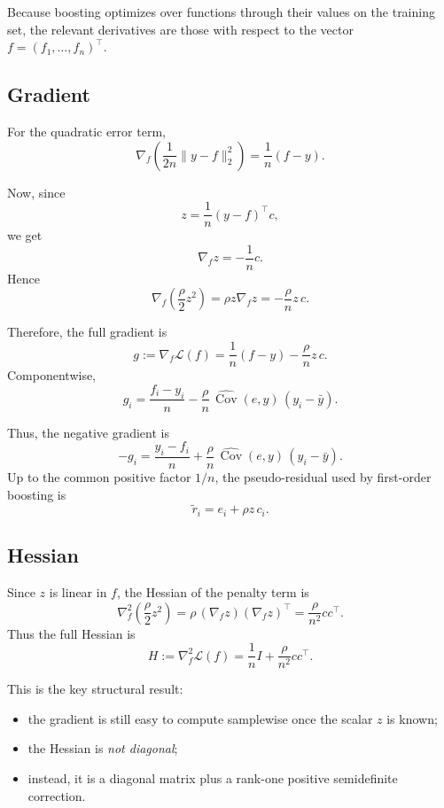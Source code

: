 \documentclass[11pt]{article}
\newcommand{\1}{\mathbf{1}}
\newcommand{\Cov}{\operatorname{Cov}}
\begin{document}
Because boosting optimizes over functions through their values on the training set, the relevant derivatives are those with respect to the vector $f=(f_1,\dots,f_n)^\top$.

\subsection{Gradient}

For the quadratic error term,
\[
\nabla_f \left(\frac{1}{2n}\|y-f\|_2^2\right)
=
\frac{1}{n}(f-y).
\]

Now, since
\[
z = \frac{1}{n}(y-f)^\top c,
\]
we get
\[
\nabla_f z = -\frac{1}{n}c.
\]
Hence
\[
\nabla_f \left(\frac{\rho}{2}z^2\right)
=
\rho z \nabla_f z
=
-\frac{\rho}{n}z\,c.
\]

Therefore, the full gradient is
\begin{equation}
\label{eq:gradient}
g := \nabla_f \mathcal{L}(f)
=
\frac{1}{n}(f-y)
-
\frac{\rho}{n} z\,c.
\end{equation}
Componentwise,
\begin{equation}
\label{eq:gradient-components}
g_i
=
\frac{f_i-y_i}{n}
-
\frac{\rho}{n}\,\widehat{\Cov}(e,y)\,(y_i-\bar y).
\end{equation}

Thus, the negative gradient is
\begin{equation}
\label{eq:neg-gradient}
-g_i
=
\frac{y_i-f_i}{n}
+
\frac{\rho}{n}\,\widehat{\Cov}(e,y)\,(y_i-\bar y).
\end{equation}
Up to the common positive factor $1/n$, the pseudo-residual used by first-order boosting is
\begin{equation}
\label{eq:pseudo-residual}
\widetilde r_i
=
e_i + \rho z\,c_i.
\end{equation}

\subsection{Hessian}

Since $z$ is linear in $f$, the Hessian of the penalty term is
\[
\nabla_f^2 \left(\frac{\rho}{2}z^2\right)
=
\rho\,(\nabla_f z)(\nabla_f z)^\top
=
\frac{\rho}{n^2}cc^\top.
\]
Thus the full Hessian is
\begin{equation}
\label{eq:hessian}
H := \nabla_f^2 \mathcal{L}(f)
=
\frac{1}{n}I
+
\frac{\rho}{n^2}cc^\top.
\end{equation}

This is the key structural result:
\begin{itemize}[leftmargin=2em]
\item the gradient is still easy to compute samplewise once the scalar $z$ is known;
\item the Hessian is \emph{not diagonal};
\item instead, it is a diagonal matrix plus a rank-one positive semidefinite correction.
\end{itemize}
\end{document}
